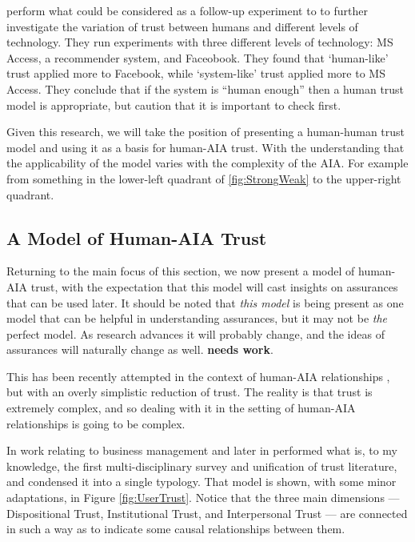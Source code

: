         \citet{Tripp2011-cq} perform what could be considered as a follow-up experiment to \cite{Lankton2008-ct} to further investigate the variation of trust between humans and different levels of technology. They run experiments with three different levels of technology: MS Access, a recommender system, and Faceobook. They found that `human-like' trust applied more to Facebook, while `system-like' trust applied more to MS Access. They conclude that if the system is ``human enough'' then a human trust model is appropriate, but caution that it is important to check first.

        Given this research, we will take the position of presenting a human-human trust model and using it as a basis for human-AIA trust. With the understanding that the applicability of the model varies with the complexity of the AIA. For example from something in the lower-left quadrant of \ref{fig:StrongWeak} to the upper-right quadrant.

    \subsection{A Model of Human-AIA Trust}
        Returning to the main focus of this section, we now present a model of human-AIA trust, with the expectation that this model will cast insights on assurances that can be used later. It should be noted that \emph{this model} is being present as one model that can be helpful in understanding assurances, but it may not be \emph{the} perfect model. As research advances it will probably change, and the ideas of assurances will naturally change as well. \textbf{needs work}.

        This has been recently attempted in the context of human-AIA relationships \cite{Lahijanian2016-nd}, but with an overly simplistic reduction of trust. The reality is that trust is extremely complex, and so dealing with it in the setting of human-AIA relationships is going to be complex.

        In work relating to business management \citet{McKnight1998-ty} and later in \cite{McKnight2001-fa} performed what is, to my knowledge, the first multi-disciplinary survey and unification of trust literature, and condensed it into a single typology. That model is shown, with some minor adaptations, in Figure \ref{fig:UserTrust}. Notice that the three main dimensions --- Dispositional Trust, Institutional Trust, and Interpersonal Trust --- are connected in such a way as to indicate some causal relationships between them.

